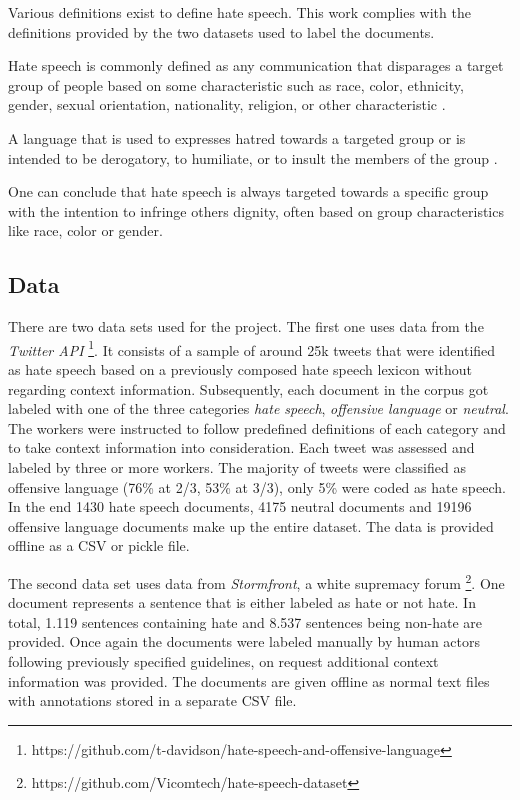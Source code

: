 Various definitions exist to define hate speech. This work complies with the definitions provided by the two datasets used to label the documents. 

\begin{defStrich}
	Hate speech is commonly defined as any communication that disparages a target group of people based on some characteristic such as race, color, ethnicity, gender, sexual orientation, nationality, religion, or other characteristic \cite{DeGibert2020}.
\end{defStrich}

\begin{defStrich}
	A language that is used to expresses hatred towards a targeted group or is intended to be derogatory, to humiliate, or to insult the members of the group \cite{ThomasDavidson2020}.
\end{defStrich}

One can conclude that hate speech is always targeted towards a specific group with the intention to infringe others dignity, often based on group characteristics like race, color or gender. 

\subsection{Data}
\label{ch:approachB}

There are two data sets used for the project. The first one uses data from the \textit{Twitter API} \cite{ThomasDavidson2020}\footnote{https://github.com/t-davidson/hate-speech-and-offensive-language}. It consists of a sample of around 25k tweets that were identified as hate speech based on a previously composed hate speech lexicon without regarding context information. Subsequently, each document in the corpus got labeled with one of the three categories \textit{hate speech}, \textit{offensive language} or \textit{neutral}. The workers were instructed to follow predefined definitions of each category and to take context information into consideration. Each tweet was assessed and labeled by three or more workers. The majority of tweets were classified as offensive language (76\% at 2/3, 53\% at 3/3), only 5\% were coded as hate speech. In the end 1430 hate speech documents, 4175 neutral documents and 19196 offensive language documents make up the entire dataset. The data is provided offline as a CSV or pickle file. 

The second data set uses data from \textit{Stormfront}, a white supremacy forum \cite{DeGibert2020}\footnote{https://github.com/Vicomtech/hate-speech-dataset}. One document represents a sentence that is either labeled as hate or not hate. In total, 1.119 sentences containing hate and 8.537 sentences being non-hate are provided. Once again the documents were labeled manually by human actors following previously specified guidelines, on request additional context information was provided. The documents are given offline as normal text files with annotations stored in a separate CSV file. 

